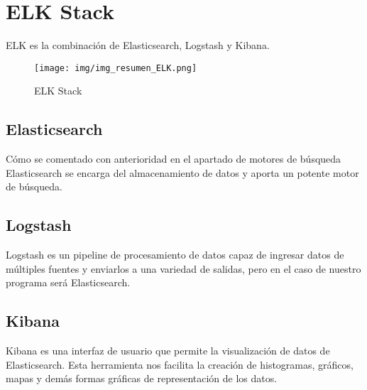 \section{ELK Stack}
ELK es la combinación de Elasticsearch, Logstash y Kibana.

\begin{figure}[h]
	\centering
	\texttt{[image: img/img\_resumen\_ELK.png]}
	\caption{ELK Stack}
	\label{img_resumen_ELK}
\end{figure}

\subsection{Elasticsearch}
Cómo se comentado con anterioridad en el apartado de motores de búsqueda Elasticsearch se encarga del almacenamiento de datos y aporta un potente motor de búsqueda.

\subsection{Logstash}
Logstash es un pipeline de procesamiento de datos capaz de ingresar datos de múltiples fuentes y enviarlos a una variedad de salidas, pero en el caso de nuestro programa será Elasticsearch.

\subsection{Kibana}
Kibana es una interfaz de usuario que permite la visualización de datos de Elasticsearch. Esta herramienta nos facilita la creación de histogramas, gráficos, mapas y demás formas gráficas de representación de los datos.